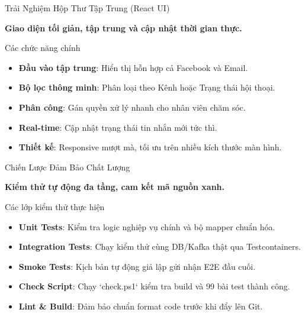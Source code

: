 \documentclass[aspectratio=169, 10pt]{beamer}
\begin{document}
\begin{frame}{Trải Nghiệm Hộp Thư Tập Trung (React UI)}
    \begin{center}
        \large\textbf{\color{accent}Giao diện tối giản, tập trung và cập nhật thời gian thực.}
    \end{center}
    \vspace{0.4cm}
    \begin{block}{Các chức năng chính}
        \begin{itemize}
            \item \textbf{Đầu vào tập trung}: Hiển thị hỗn hợp cả Facebook và Email.
            \item \textbf{Bộ lọc thông minh}: Phân loại theo Kênh hoặc Trạng thái hội thoại.
            \item \textbf{Phân công}: Gán quyền xử lý nhanh cho nhân viên chăm sóc.
            \item \textbf{Real-time}: Cập nhật trạng thái tin nhắn mới tức thì.
            \item \textbf{Thiết kế}: Responsive mượt mà, tối ưu trên nhiều kích thước màn hình.
        \end{itemize}
    \end{block}
\end{frame}

\begin{frame}{Chiến Lược Đảm Bảo Chất Lượng}
    \begin{center}
        \large\textbf{\color{accent}Kiểm thử tự động đa tầng, cam kết mã nguồn xanh.}
    \end{center}
    \vspace{0.4cm}
    \begin{block}{Các lớp kiểm thử thực hiện}
        \begin{itemize}
            \item \textbf{Unit Tests}: Kiểm tra logic nghiệp vụ chính và bộ mapper chuẩn hóa.
            \item \textbf{Integration Tests}: Chạy kiểm thử cùng DB/Kafka thật qua Testcontainers.
            \item \textbf{Smoke Tests}: Kịch bản tự động giả lập gửi nhận E2E đầu cuối.
            \item \textbf{Check Script}: Chạy `check.ps1` kiểm tra build và 99 bài test thành công.
            \item \textbf{Lint \& Build}: Đảm bảo chuẩn format code trước khi đẩy lên Git.
        \end{itemize}
    \end{block}
\end{frame}
\end{document}
